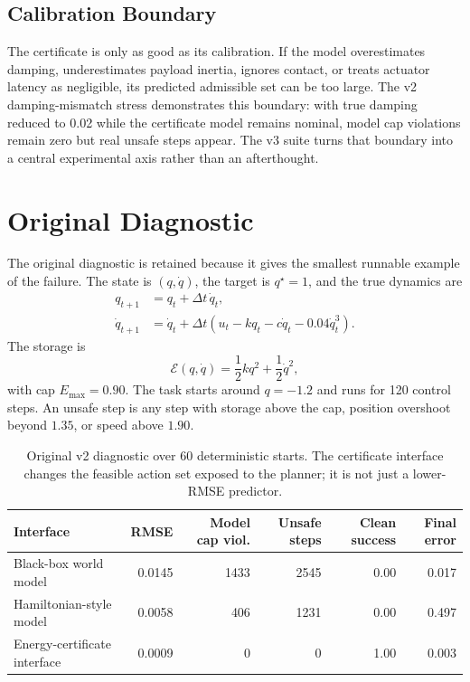 \documentclass{article}
\newcommand{\storage}{\mathcal{E}}
\begin{document}
\subsection{Calibration Boundary}

The certificate is only as good as its calibration. If the model overestimates damping, underestimates payload inertia, ignores contact, or treats actuator latency as negligible, its predicted admissible set can be too large. The v2 damping-mismatch stress demonstrates this boundary: with true damping reduced to 0.02 while the certificate model remains nominal, model cap violations remain zero but real unsafe steps appear. The v3 suite turns that boundary into a central experimental axis rather than an afterthought.

\section{Original Diagnostic}

The original diagnostic is retained because it gives the smallest runnable example of the failure. The state is $(q,\dot q)$, the target is $q^\star=1$, and the true dynamics are
\begin{align}
    q_{t+1} &= q_t+\Delta t\,\dot q_t,\\
    \dot q_{t+1} &=
    \dot q_t+\Delta t\left(u_t-kq_t-c\dot q_t-0.04\dot q_t^3\right).
\end{align}
The storage is
\begin{equation}
    \storage(q,\dot q)=\frac{1}{2}kq^2+\frac{1}{2}\dot q^2,
\end{equation}
with cap $E_{\max}=0.90$. The task starts around $q=-1.2$ and runs for 120 control steps. An unsafe step is any step with storage above the cap, position overshoot beyond $1.35$, or speed above $1.90$.

\begin{table}[t]
\centering
\small
\caption{Original v2 diagnostic over 60 deterministic starts. The certificate interface changes the feasible action set exposed to the planner; it is not just a lower-RMSE predictor.}
\label{tab:toy}
\begin{tabular}{lrrrrr}
\toprule
Interface & RMSE & Model cap viol. & Unsafe steps & Clean success & Final error \\
\midrule
Black-box world model & 0.0145 & 1433 & 2545 & 0.00 & 0.017 \\
Hamiltonian-style model & 0.0058 & 406 & 1231 & 0.00 & 0.497 \\
Energy-certificate interface & 0.0009 & 0 & 0 & 1.00 & 0.003 \\
\bottomrule
\end{tabular}
\end{table}
\end{document}
